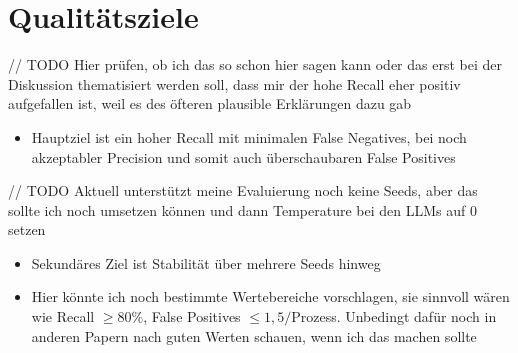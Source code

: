\section{Qualitätsziele}\label{sec:qualitatsziele}

// TODO Hier prüfen, ob ich das so schon hier sagen kann oder das erst bei der Diskussion thematisiert werden soll, dass mir der hohe Recall eher positiv aufgefallen ist, weil es des öfteren plausible Erklärungen dazu gab

\begin{itemize}
    \item Hauptziel ist ein hoher Recall mit minimalen False Negatives, bei noch akzeptabler Precision und somit auch überschaubaren False Positives
\end{itemize}

// TODO Aktuell unterstützt meine Evaluierung noch keine Seeds, aber das sollte ich noch umsetzen können und dann Temperature bei den LLMs auf 0 setzen

\begin{itemize}
    \item Sekundäres Ziel ist Stabilität über mehrere Seeds hinweg
    \item Hier könnte ich noch bestimmte Wertebereiche vorschlagen, sie sinnvoll wären wie Recall $\geq 80\%$, False Positives $\leq 1{,}5/$Prozess. Unbedingt dafür noch in anderen Papern nach guten Werten schauen, wenn ich das machen sollte
\end{itemize}